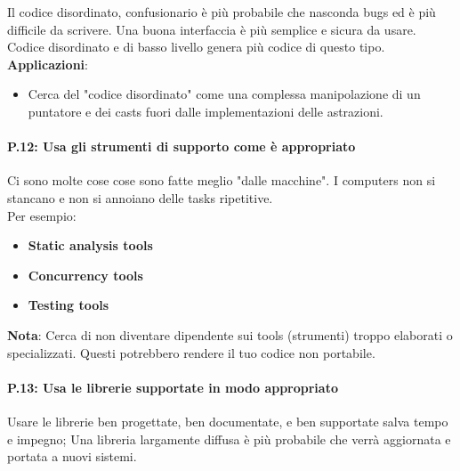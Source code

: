 \textsf{\small Il codice disordinato, confusionario è più probabile che nasconda bugs ed è più difficile da scrivere. Una buona interfaccia è più semplice e sicura da usare. Codice disordinato e di basso livello genera più codice di questo tipo.} \\

\textsf{\small \textbf{Applicazioni}: }

\begin{itemize}
	\item \textsf{\small Cerca del "codice disordinato" come una complessa manipolazione di un puntatore e dei casts fuori dalle implementazioni delle astrazioni.}
\end{itemize}

\paragraph{P.12: Usa gli strumenti di supporto come è appropriato}

\textsf{\small Ci sono molte cose cose sono fatte meglio "dalle macchine". I computers non si stancano e non si annoiano delle tasks ripetitive.} \\

\textsf{\small Per esempio: } \\

\begin{itemize}
	\item \textsf{\small \textbf{Static analysis tools}} %
	\item \textsf{\small \textbf{Concurrency tools}} %
	\item \textsf{\small \textbf{Testing tools}} %
\end{itemize}

\textsf{\small \textbf{Nota}: Cerca di non diventare dipendente sui tools (strumenti) troppo elaborati o specializzati. Questi potrebbero rendere il tuo codice non portabile.} \\

\paragraph{P.13: Usa le librerie supportate in modo appropriato}

\textsf{\small Usare le librerie ben progettate, ben documentate, e ben supportate salva tempo e impegno; Una libreria largamente diffusa è più probabile che verrà aggiornata e portata a nuovi sistemi.} \\

